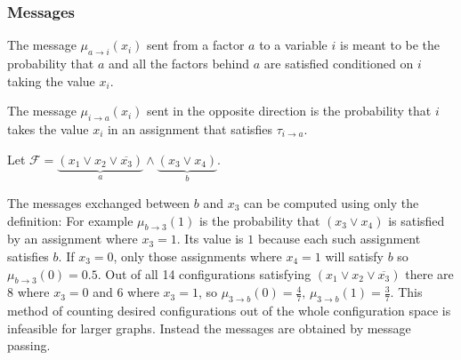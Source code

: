 \subsubsection{Messages}

The message $\mu_{a \rightarrow i}(x_i)$ sent from a factor $a$ to a variable $i$ is meant to be the probability that $a$ and all the factors behind $a$ are satisfied conditioned on $i$ taking the value $x_i$. 


The message $\mu_{i \rightarrow a}(x_i)$ sent in the opposite direction is the probability that $i$ takes the value $x_i$ in an assignment that satisfies $\tau_{i \rightarrow a}$.

\begin{example}
Let $\mathcal{F} = \underbrace{(x_1 \lor x_2 \lor \overline{x_3})}_a  \land \underbrace{(x_3 \lor x_4)}_b $.
\end{example}
\begin{figure}[h]
\centering

\end{figure}
The messages exchanged between $b$ and $x_3$ can be computed using only the definition: \newline
For example $\mu_{b \rightarrow 3}(1)$ is the probability that $(x_3 \lor x_4)$ is satisfied by an assignment where $x_3 = 1$. Its value is $1$ because each such assignment satisfies $b$. If $x_3 = 0$, only those assignments where $x_4 = 1$ will satisfy $b$ so $\mu_{b \rightarrow 3}(0) = 0.5$. \newline
Out of all 14 configurations satisfying $(x_1 \lor x_2 \lor \overline{x_3})$ there are $8$ where $x_3 = 0$ and $6$ where $x_3 = 1$, so $\mu_{3 \rightarrow b}(0) = \frac{4}{7}, \, \mu_{3 \rightarrow b}(1) = \frac{3}{7}$.
This method of counting desired configurations out of the whole configuration space is infeasible for larger graphs. Instead the messages are obtained by message passing.

